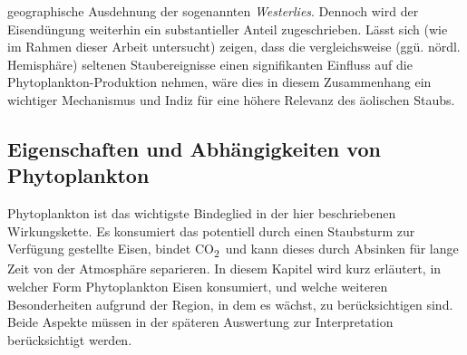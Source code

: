 \documentclass[12pt,a4paper,onecolumn,headheight=30pt]{scrartcl}
\newcommand{\cotwo}{CO\textsubscript{2}}
\begin{document}
geographische Ausdehnung der sogenannten \textit{Westerlies}. Dennoch wird der Eisendüngung weiterhin ein substantieller Anteil zugeschrieben. Lässt sich (wie im Rahmen dieser Arbeit untersucht) zeigen, dass die vergleichsweise (ggü. nördl. Hemisphäre) seltenen Staubereignisse einen signifikanten Einfluss auf die Phytoplankton-Produktion nehmen, wäre dies in diesem Zusammenhang ein wichtiger Mechanismus und Indiz für eine höhere Relevanz des äolischen Staubs.
\subsection{Eigenschaften und Abhängigkeiten von Phytoplankton} \label{sec:Phytoplankton}
Phytoplankton ist das wichtigste Bindeglied in der hier beschriebenen Wirkungskette. Es konsumiert das potentiell durch einen Staubsturm zur Verfügung gestellte Eisen, bindet \cotwo \ und kann dieses durch Absinken für lange Zeit von der Atmosphäre separieren. In diesem Kapitel wird kurz erläutert, in welcher Form Phytoplankton Eisen konsumiert, und 
welche weiteren Besonderheiten aufgrund der Region, in dem es wächst, zu berücksichtigen sind. Beide Aspekte müssen in der späteren Auswertung zur Interpretation berücksichtigt werden.
\end{document}

